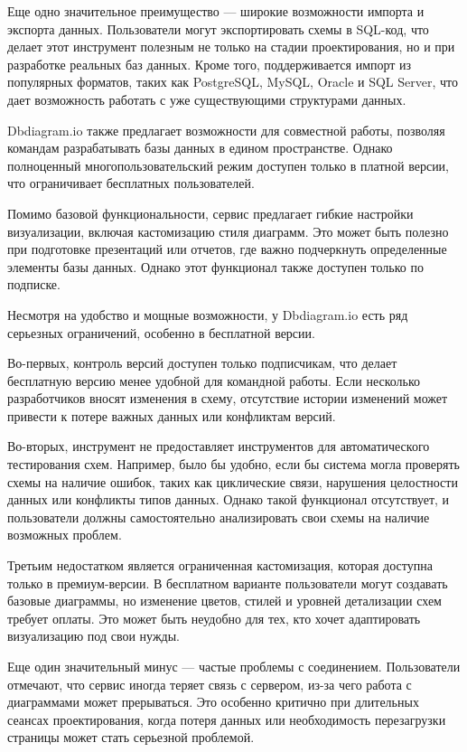 Еще одно значительное преимущество — широкие возможности импорта и экспорта данных. Пользователи могут экспортировать схемы в SQL-код, что делает этот инструмент полезным не только на стадии проектирования, но и при разработке реальных баз данных. Кроме того, поддерживается импорт из популярных форматов, таких как PostgreSQL, MySQL, Oracle и SQL Server, что дает возможность работать с уже существующими структурами данных.

Dbdiagram.io также предлагает возможности для совместной работы, позволяя командам разрабатывать базы данных в едином пространстве. Однако полноценный многопользовательский режим доступен только в платной версии, что ограничивает бесплатных пользователей.

Помимо базовой функциональности, сервис предлагает гибкие настройки визуализации, включая кастомизацию стиля диаграмм. Это может быть полезно при подготовке презентаций или отчетов, где важно подчеркнуть определенные элементы базы данных. Однако этот функционал также доступен только по подписке.

Несмотря на удобство и мощные возможности, у Dbdiagram.io есть ряд серьезных ограничений, особенно в бесплатной версии.

Во-первых, контроль версий доступен только подписчикам, что делает бесплатную версию менее удобной для командной работы. Если несколько разработчиков вносят изменения в схему, отсутствие истории изменений может привести к потере важных данных или конфликтам версий.

Во-вторых, инструмент не предоставляет инструментов для автоматического тестирования схем. Например, было бы удобно, если бы система могла проверять схемы на наличие ошибок, таких как циклические связи, нарушения целостности данных или конфликты типов данных. Однако такой функционал отсутствует, и пользователи должны самостоятельно анализировать свои схемы на наличие возможных проблем.

Третьим недостатком является ограниченная кастомизация, которая доступна только в премиум-версии. В бесплатном варианте пользователи могут создавать базовые диаграммы, но изменение цветов, стилей и уровней детализации схем требует оплаты. Это может быть неудобно для тех, кто хочет адаптировать визуализацию под свои нужды.

Еще один значительный минус — частые проблемы с соединением. Пользователи отмечают, что сервис иногда теряет связь с сервером, из-за чего работа с диаграммами может прерываться. Это особенно критично при длительных сеансах проектирования, когда потеря данных или необходимость перезагрузки страницы может стать серьезной проблемой.

